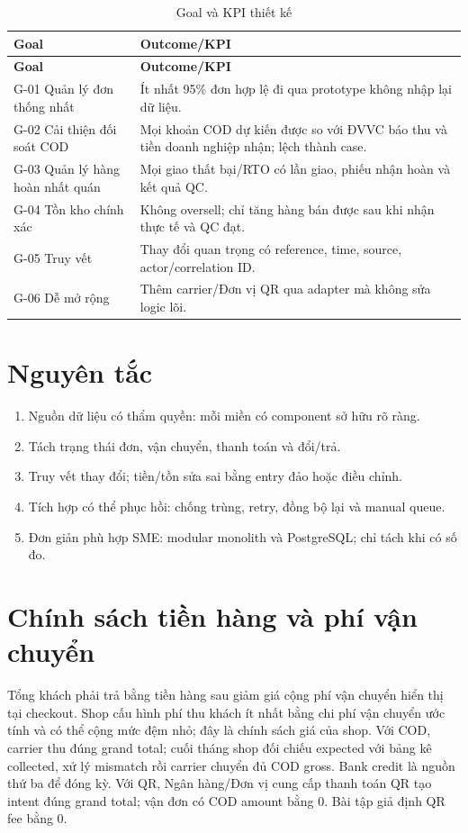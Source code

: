 \documentclass[12pt,a4paper]{report}
\begin{document}
\begin{longtable}{p{}p{}}
\caption{Goal và KPI thiết kế}\\
\toprule
\textbf{Goal} & \textbf{Outcome/KPI}\\
\midrule\endfirsthead
\toprule\textbf{Goal} & \textbf{Outcome/KPI}\\\midrule\endhead
G-01 Quản lý đơn thống nhất & Ít nhất 95\% đơn hợp lệ đi qua prototype không nhập lại dữ liệu.\\
G-02 Cải thiện đối soát COD & Mọi khoản COD dự kiến được so với ĐVVC báo thu và tiền doanh nghiệp nhận; lệch thành case.\\
G-03 Quản lý hàng hoàn nhất quán & Mọi giao thất bại/RTO có lần giao, phiếu nhận hoàn và kết quả QC.\\
G-04 Tồn kho chính xác & Không oversell; chỉ tăng hàng bán được sau khi nhận thực tế và QC đạt.\\
G-05 Truy vết & Thay đổi quan trọng có reference, time, source, actor/correlation ID.\\
G-06 Dễ mở rộng & Thêm carrier/Đơn vị QR qua adapter mà không sửa logic lõi.\\
\bottomrule
\end{longtable}

\section{Nguyên tắc}
\begin{enumerate}[label=AP-0\arabic*]
\item Nguồn dữ liệu có thẩm quyền: mỗi miền có component sở hữu rõ ràng.
\item Tách trạng thái đơn, vận chuyển, thanh toán và đổi/trả.
\item Truy vết thay đổi; tiền/tồn sửa sai bằng entry đảo hoặc điều chỉnh.
\item Tích hợp có thể phục hồi: chống trùng, retry, đồng bộ lại và manual queue.
\item Đơn giản phù hợp SME: modular monolith và PostgreSQL; chỉ tách khi có số đo.
\end{enumerate}

\section{Chính sách tiền hàng và phí vận chuyển}
Tổng khách phải trả bằng tiền hàng sau giảm giá cộng phí vận chuyển hiển thị tại checkout. Shop cấu hình phí thu khách ít nhất bằng chi phí vận chuyển ước tính và có thể cộng mức đệm nhỏ; đây là chính sách giá của shop. Với COD, carrier thu đúng grand total; cuối tháng shop đối chiếu expected với bảng kê collected, xử lý mismatch rồi carrier chuyển đủ COD gross. Bank credit là nguồn thứ ba để đóng kỳ. Với QR, Ngân hàng/Đơn vị cung cấp thanh toán QR tạo intent đúng grand total; vận đơn có COD amount bằng 0. Bài tập giả định QR fee bằng 0.
\end{document}
